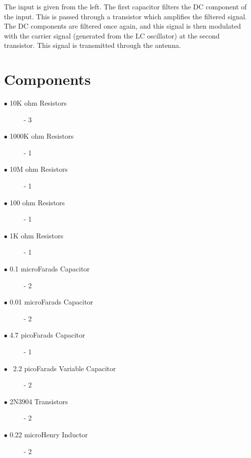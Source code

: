 \documentclass[journal,10pt,twocolumn]{IEEEtran}
\begin{document}
The input is given from the left. The first capacitor filters the DC component of the input. This is passed through a transistor which amplifies the filtered signal. The DC components are filtered once again, and this signal is then modulated with the carrier signal (generated from the LC oscillator) at the second transistor. This signal is transmitted through the antenna.

\section*{Components}
\begin{description}
	\item[$\bullet$ 10K ohm Resistors] - 3
	\item[$\bullet$ 1000K ohm Resistors] - 1
	\item[$\bullet$ 10M ohm Resistors] - 1
	\item[$\bullet$ 100 ohm Resistors] - 1
	\item[$\bullet$ 1K ohm Resistors] - 1
	\item[$\bullet$ 0.1 microFarads Capacitor] - 2
	\item[$\bullet$ 0.01 microFarads Capacitor] - 2
	\item[$\bullet$ 4.7 picoFarads Capacitor] - 1
	\item[$\bullet$ ~2.2 picoFarads Variable Capacitor] - 2
	\item[$\bullet$ 2N3904 Transistors] - 2
	\item[$\bullet$ 0.22 microHenry Inductor] - 2

\end{description}
\end{document}
